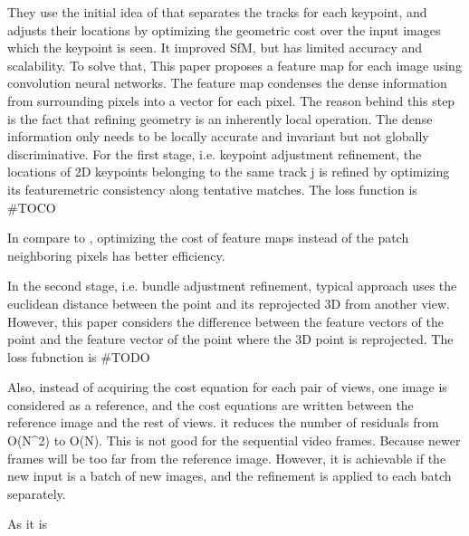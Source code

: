 \documentclass[11pt]{article}
\begin{document}
    They use the initial idea of \cite{Dusmanu2020Multi} that separates the tracks for each keypoint, and
    adjusts their locations by optimizing the geometric cost over the input images which the keypoint
    is seen. It improved SfM, but has limited accuracy and scalability. To solve that, This paper proposes
    a feature map for each image using convolution neural networks. The feature map condenses the dense
    information from surrounding pixels into a vector for each pixel. The reason behind this step is the
    fact that refining geometry is an inherently local operation. The dense information only needs to be
    locally accurate and invariant but not globally discriminative.
    For the first stage, i.e. keypoint adjustment refinement, the locations of 2D keypoints belonging to the same
    track j is refined by optimizing its featuremetric consistency along tentative matches. The loss function is
    #TOCO

    In compare to \cite{Dusmanu2020Multi}, optimizing the cost of feature maps instead of the patch neighboring
    pixels has better efficiency.

    In the second stage, i.e. bundle adjustment refinement, typical approach uses the euclidean distance between the point and
    its reprojected 3D from another view. However, this paper considers the difference between the feature vectors
    of the point and the feature vector of the point where the 3D point is reprojected. The loss fubnction is
    #TODO

    Also, instead of acquiring the cost equation for each pair of views, one image is considered as a reference,
    and the cost equations are written between the reference image and the rest of views. it reduces the number
    of residuals from O(N^2) to O(N). This is not good for the sequential video frames. Because newer frames will be
    too far from the reference image. However, it is achievable if the new input is a batch of new images, and
    the refinement is applied to each batch separately.

    As it is
\end{document}
